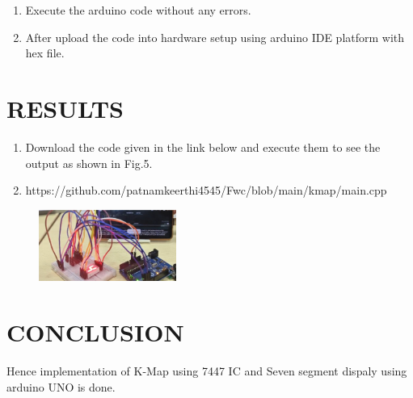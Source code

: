 \documentclass[conference]{IEEEtran}
\begin{document}
\begin{enumerate}
\item Execute the arduino code without any errors.
\item After upload the code into hardware setup using arduino IDE platform with hex file.
 \end{enumerate}
\newpage
\section{RESULTS}
 \begin{enumerate}
	 \item Download the code given in the link below and execute them to see the output as shown in Fig.5. 
	 \item https://github.com/patnamkeerthi4545/Fwc/blob/main/kmap/main.cpp
 \end{enumerate}


\begin{figure}[h]                           
\centering                                 
\includegraphics[width=0.4\textwidth]{fig5.jpg   }                                           
\caption{\label{fig-5:Gates}}               
\end{figure}

\section{CONCLUSION}
 Hence implementation of K-Map using 7447 IC and Seven segment dispaly using arduino UNO is done.
\end{document}
